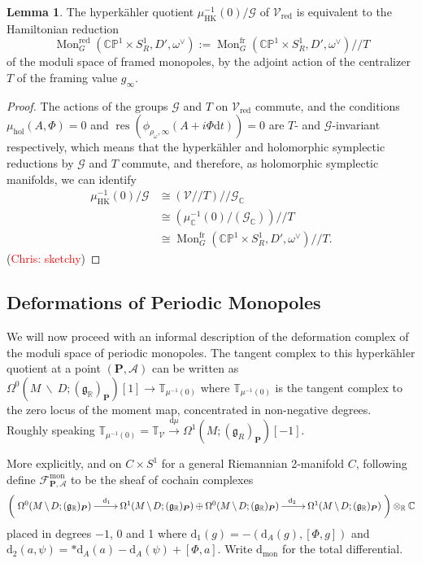 \documentclass[11pt, oneside, reqno]{amsart}
\theoremstyle{definition} \newtheorem{definition}{Definition}[section]
\newtheorem{lemma}[definition]{Lemma}
\theoremstyle{definition} \newtheorem{remark}[definition]{Remark}
\theoremstyle{definition} \newtheorem{remarks}[definition]{Remarks}
\theoremstyle{definition} \newtheorem{question}[definition]{Question}
\theoremstyle{definition} \newtheorem*{note}{Note}
\theoremstyle{definition} \newtheorem{example}[definition]{Example}
\theoremstyle{definition} \newtheorem{examples}[definition]{Examples}
\renewcommand{\gg}{\mathfrak{g}}
\newcommand{\bb}[1]{\mathbb{#1}}
\newcommand{\mr}[1]{\mathrm{#1}}
\newcommand{\mc}[1]{\mathcal{#1}}
\newcommand{\bo}[1]{\boldsymbol{#1}}
\newcommand{\bs}{\ \backslash \ }
\newcommand{\CC}{\mathbb{C}}
\newcommand{\RR}{\mathbb{R}}
\newcommand{\iso}{\cong}
\DeclareMathOperator{\res}{res}
\DeclareMathOperator{\mon}{Mon}
\renewcommand{\d}{\mathrm{d}}
\newcommand{\fr}{\mathrm{fr}}
\newcommand{\chris}[1]{(\textcolor{red}{Chris: #1})}
\begin{document}
\begin{lemma}
The hyperk\"ahler quotient $\mu_{\mr{HK}}^{-1}(0)/\mc G$ of $\mc V_{\mr{red}}$ is equivalent to the Hamiltonian reduction 
\[\mon^\mr{red}_G(\bb{CP}^1 \times S^1_R, D', \omega^\vee) := \mon^\fr_G(\bb{CP}^1 \times S^1_R, D', \omega^\vee) /\!/ T\]
of the moduli space of framed monopoles, by the adjoint action of the centralizer $T$ of the framing value $g_\infty$.
\end{lemma}

\begin{proof}
The actions of the groups $\mc G$ and $T$ on $\mc V_{\mr{red}}$ commute, and the conditions $\mu_{\mr{hol}}(A,\Phi) = 0$ and $\res(\phi_{\rho_\omega, \infty}(A + i \Phi \d t)) = 0$ are $T$- and $\mc G$-invariant respectively, which means that the hyperk\"ahler and holomorphic symplectic reductions by $\mc G$ and $T$ commute, and therefore, as holomorphic symplectic manifolds, we can identify
\begin{align*}
\mu_{\mr{HK}}^{-1}(0)/\mc G &\iso (\mc V/\!/ T) /\!/ \mc G_\CC \\
&\iso \left( \mu_{\CC}^{-1}(0)/(\mc G_\CC) \right) /\!/ T \\
&\iso \mon^\fr_G(\bb{CP}^1 \times S^1_R, D', \omega^\vee) /\!/ T.
\end{align*}
\chris{sketchy}
\end{proof}
 
\subsection{Deformations of Periodic Monopoles} \label{monopole_def_section}
We will now proceed with an informal description of the deformation complex of the moduli space of periodic monopoles.  The tangent complex to this hyperk\"ahler quotient at a point $(\bo P, \mc A)$ can be written as $\Omega^0(M \!\bs\! D; (\gg_\RR)_{\bo P})[1] \to \bb T_{\mu^{-1}(0)}$ where $\bb T_{\mu^{-1}(0)}$ is the tangent complex to the zero locus of the moment map, concentrated in non-negative degrees. Roughly speaking $\bb T_{\mu^{-1}(0)} = \bb T_{\mc V} \overset {\d\mu} \to \Omega^1(M; (\gg_R)_{\bo P})[-1]$.  

More explicitly, and on $C \times S^1$ for a general Riemannian 2-manifold $C$, following \cite{FoscoloDef} define $\mc F^{\mr{mon}}_{\bo P, \mc A}$ to be the sheaf of cochain complexes
\[\left(\xymatrix{
\Omega^0(M \!\bs\! D; (\gg_\RR)_{\bo P}) \ar[r]^(.36){\d_1} &\Omega^1(M \!\bs\! D; (\gg_\RR)_{\bo P}) \oplus \Omega^0(M \!\bs\! D; (\gg_\RR)_{\bo P}) \ar[r]^(.64){\d_2} &\Omega^1(M \!\bs\! D; (\gg_\RR)_{\bo P})
}\right) \otimes_\RR \CC\]
placed in degrees $-1$, 0 and 1 where $\d_1(g) = -(\d_A(g),[\Phi, g])$ and $\d_2(a,\psi) = \ast \d_A(a) - \d_A(\psi) + [\Phi,a]$.  Write $\d_{\mr{mon}}$ for the total differential.
  
\end{document}
